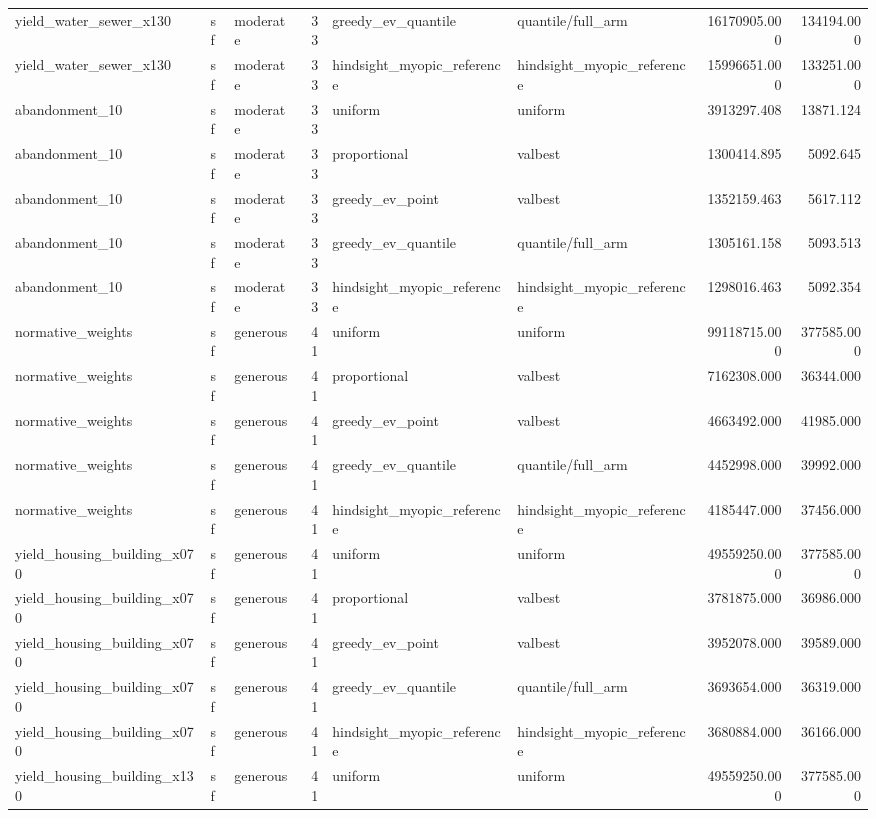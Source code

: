 \begin{tabular}{lllrllrr}
yield\_water\_sewer\_x130 & sf & moderate & 33 & greedy\_ev\_quantile & quantile/full\_arm & 16170905.000 & 134194.000 \\
yield\_water\_sewer\_x130 & sf & moderate & 33 & hindsight\_myopic\_reference & hindsight\_myopic\_reference & 15996651.000 & 133251.000 \\
abandonment\_10 & sf & moderate & 33 & uniform & uniform & 3913297.408 & 13871.124 \\
abandonment\_10 & sf & moderate & 33 & proportional & valbest & 1300414.895 & 5092.645 \\
abandonment\_10 & sf & moderate & 33 & greedy\_ev\_point & valbest & 1352159.463 & 5617.112 \\
abandonment\_10 & sf & moderate & 33 & greedy\_ev\_quantile & quantile/full\_arm & 1305161.158 & 5093.513 \\
abandonment\_10 & sf & moderate & 33 & hindsight\_myopic\_reference & hindsight\_myopic\_reference & 1298016.463 & 5092.354 \\
normative\_weights & sf & generous & 41 & uniform & uniform & 99118715.000 & 377585.000 \\
normative\_weights & sf & generous & 41 & proportional & valbest & 7162308.000 & 36344.000 \\
normative\_weights & sf & generous & 41 & greedy\_ev\_point & valbest & 4663492.000 & 41985.000 \\
normative\_weights & sf & generous & 41 & greedy\_ev\_quantile & quantile/full\_arm & 4452998.000 & 39992.000 \\
normative\_weights & sf & generous & 41 & hindsight\_myopic\_reference & hindsight\_myopic\_reference & 4185447.000 & 37456.000 \\
yield\_housing\_building\_x070 & sf & generous & 41 & uniform & uniform & 49559250.000 & 377585.000 \\
yield\_housing\_building\_x070 & sf & generous & 41 & proportional & valbest & 3781875.000 & 36986.000 \\
yield\_housing\_building\_x070 & sf & generous & 41 & greedy\_ev\_point & valbest & 3952078.000 & 39589.000 \\
yield\_housing\_building\_x070 & sf & generous & 41 & greedy\_ev\_quantile & quantile/full\_arm & 3693654.000 & 36319.000 \\
yield\_housing\_building\_x070 & sf & generous & 41 & hindsight\_myopic\_reference & hindsight\_myopic\_reference & 3680884.000 & 36166.000 \\
yield\_housing\_building\_x130 & sf & generous & 41 & uniform & uniform & 49559250.000 & 377585.000 \\

\end{tabular}
